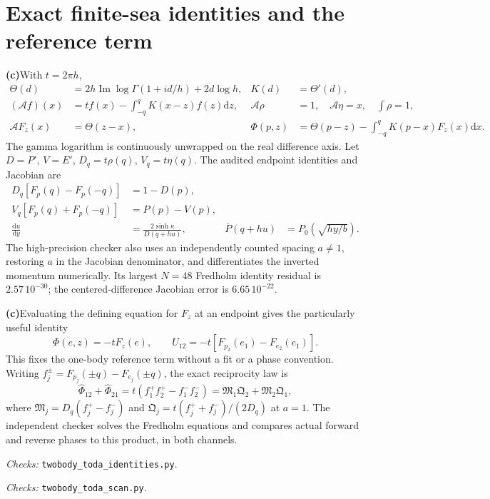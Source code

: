 \documentclass[11pt,a4paper]{article}
\newcommand{\C}{\textbf{(c)}\nobreakspace}
\newcommand{\dd}{\mathrm d}
\newcommand{\file}[1]{\nolinkurl{#1}}
\newcommand{\checks}[1]{\par\noindent\textit{Checks:} \file{twobody_toda_#1.py}.\par}
\begin{document}
\section{Exact finite-sea identities and the reference term}
\C With $t=2\pi h$,
\begin{align}
 \Theta(d)&=2h\operatorname{Im}\log\Gamma(1+id/h)+2d\log h,
 &K(d)&=\Theta'(d),\\
 (\mathcal Af)(x)&=tf(x)-\int_{-q}^qK(x-z)f(z)\dd z,
 &\mathcal A\rho&=1,\quad \mathcal A\eta=x,\quad\int\rho=1,\\
 \mathcal AF_z(x)&=\Theta(z-x),
 &\Phi(p,z)&=\Theta(p-z)-\int_{-q}^qK(p-x)F_z(x)\dd x.
\end{align}
The gamma logarithm is continuously unwrapped on the real difference axis.
Let $D=P'$, $V=E'$, $D_q=t\rho(q)$, $V_q=t\eta(q)$.
The audited endpoint identities and Jacobian are
\begin{align}
 D_q[F_p(q)-F_p(-q)]&=1-D(p),\\
 V_q[F_p(q)+F_p(-q)]&=P(p)-V(p),\\
 \frac{\dd u}{\dd y}&=\frac{2\sinh\kappa}{D(q+hu)},
 &\overline P(q+hu)&=P_0(\sqrt{hy/b}).
 \label{eq:jac}
\end{align}
The high-precision checker also uses an independently counted spacing
$a\ne1$, restoring $a$ in the Jacobian denominator, and differentiates the
inverted momentum numerically. Its largest $N=48$ Fredholm identity residual
is $2.57\,10^{-30}$; the centered-difference Jacobian error is
$6.65\,10^{-22}$.

\C Evaluating the defining equation for $F_z$ at an endpoint gives the
particularly useful identity
\begin{equation}
 \boxed{\Phi(e,z)=-tF_z(e),\qquad
 U_{12}=-t[F_{p_2}(e_1)-F_{e_2}(e_1)].}
 \label{eq:Uexact}
\end{equation}
This fixes the one-body reference term without a fit or a phase convention.
Writing $f_j^\pm=F_{p_j}(\pm q)-F_{e_j}(\pm q)$, the exact reciprocity law is
\begin{equation}
 \widehat\Phi_{12}+\widehat\Phi_{21}
 =t(f_1^+f_2^+-f_1^-f_2^-)
 =\mathfrak M_1\mathfrak Q_2+\mathfrak M_2\mathfrak Q_1,
\end{equation}
where $\mathfrak M_j=D_q(f_j^+-f_j^-)$ and
$\mathfrak Q_j=t(f_j^++f_j^-)/(2D_q)$ at $a=1$.
The independent checker solves the Fredholm equations and compares actual
forward and reverse phases to this product, in both channels.
\checks{identities}\checks{scan}
\end{document}
